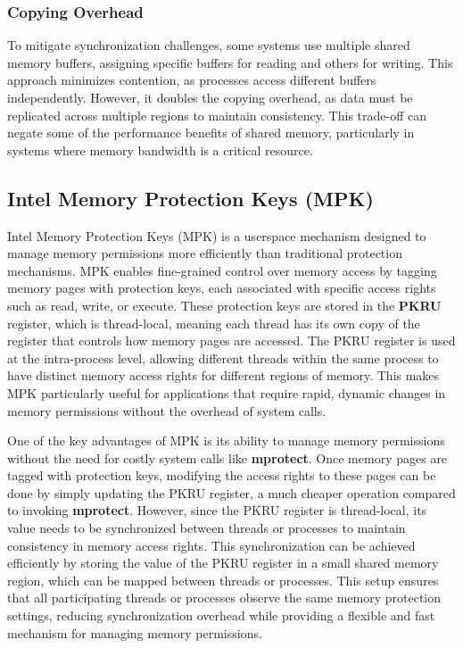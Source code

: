 \documentclass[letterpaper,twocolumn,10pt]{article}
\begin{document}
\subsubsection{Copying Overhead}
To mitigate synchronization challenges, some systems use multiple shared memory buffers, assigning specific buffers for reading and others for writing.
This approach minimizes contention, as processes access different buffers independently.
However, it doubles the copying overhead, as data must be replicated across multiple regions to maintain consistency.
This trade-off can negate some of the performance benefits of shared memory, particularly in systems where memory bandwidth is a critical resource.

\subsection{Intel Memory Protection Keys (MPK)}
Intel Memory Protection Keys (MPK) is a userspace mechanism designed to manage memory permissions more efficiently than traditional protection mechanisms.
MPK enables fine-grained control over memory access by tagging memory pages with protection keys, each associated with specific access rights such as read, write, or execute.
These protection keys are stored in the \textbf{PKRU} register, which is thread-local, meaning each thread has its own copy of the register that controls how memory pages are accessed.
The PKRU register is used at the intra-process level, allowing different threads within the same process to have distinct memory access rights for different regions of memory.
This makes MPK particularly useful for applications that require rapid, dynamic changes in memory permissions without the overhead of system calls.

One of the key advantages of MPK is its ability to manage memory permissions without the need for costly system calls like \textbf{mprotect}.
Once memory pages are tagged with protection keys, modifying the access rights to these pages can be done by simply updating the PKRU register, a much cheaper operation compared to invoking \textbf{mprotect}.
However, since the PKRU register is thread-local, its value needs to be synchronized between threads or processes to maintain consistency in memory access rights.
This synchronization can be achieved efficiently by storing the value of the PKRU register in a small shared memory region, which can be mapped between threads or processes.
This setup ensures that all participating threads or processes observe the same memory protection settings, reducing synchronization overhead while providing a flexible and fast mechanism for managing memory permissions.
\end{document}
